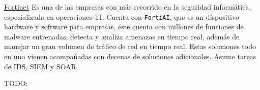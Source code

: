 \href{https://www.fortinet.com/lat/products/fortiaiops}{Fortinet} Es una de las empresas con más recorrido en la seguridad informática, especializada en operaciones TI. Cuenta con \texttt{FortiAI}, que es un dispositivo hardware y software para empresas, este cuenta con millones de funciones de malware entrenadas, detecta y analiza amenazas en tiempo real, además de manejar un gran volumen de tráfico de red en tiempo real. Estas soluciones todo en uno vienen acompañadas con decenas de soluciones adicionales. Asume tareas de \gls{IDS}, \gls{SIEM} y \gls{SOAR}.




{
\Huge
\color{red} 
TODO: 
}
